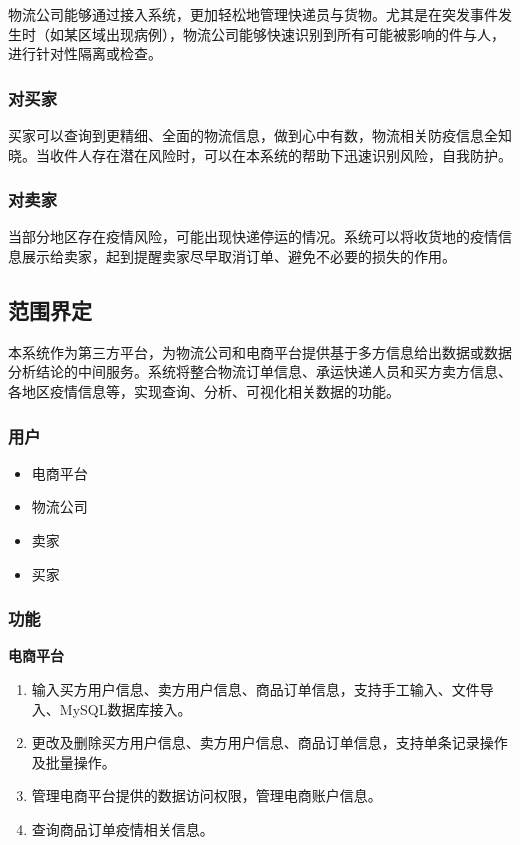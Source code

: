 \documentclass[12pt]{article}
\begin{document}
物流公司能够通过接入系统，更加轻松地管理快递员与货物。尤其是在突发事件发生时（如某区域出现病例），物流公司能够快速识别到所有可能被影响的件与人，进行针对性隔离或检查。

\subsubsection{对买家}

买家可以查询到更精细、全面的物流信息，做到心中有数，物流相关防疫信息全知晓。当收件人存在潜在风险时，可以在本系统的帮助下迅速识别风险，自我防护。

\subsubsection{对卖家}

当部分地区存在疫情风险，可能出现快递停运的情况。系统可以将收货地的疫情信息展示给卖家，起到提醒卖家尽早取消订单、避免不必要的损失的作用。

\subsection{范围界定}

本系统作为第三方平台，为物流公司和电商平台提供基于多方信息给出数据或数据分析结论的中间服务。系统将整合物流订单信息、承运快递人员和买方卖方信息、各地区疫情信息等，实现查询、分析、可视化相关数据的功能。

\subsubsection{用户}

\begin{itemize}
	\item 电商平台
	\item 物流公司
	\item 卖家
	\item 买家
\end{itemize}

\subsubsection{功能}

\noindent \textbf{电商平台}
\begin{enumerate}
	\item 输入买方用户信息、卖方用户信息、商品订单信息，支持手工输入、文件导入、MySQL数据库接入。
	\item 更改及删除买方用户信息、卖方用户信息、商品订单信息，支持单条记录操作及批量操作。
	\item 管理电商平台提供的数据访问权限，管理电商账户信息。
	\item 查询商品订单疫情相关信息。
\end{enumerate}
\end{document}
